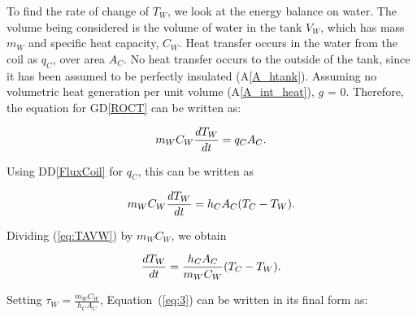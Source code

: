 \documentclass[12pt]{article}
\newcommand{\dref}[1]{GD\ref{#1}}
\newcommand{\ddref}[1]{DD\ref{#1}}
\newcommand{\aref}[1]{A\ref{#1}}
\begin{document}
To find the rate of change of $T_W$, we look at the energy balance on water.
The volume being considered is the volume of water in the tank $V_W$, which has
mass $m_W$ and specific heat capacity, $C_W$.  Heat transfer occurs in the water
from the coil as $q_C$, over area
$A_C$.  No heat transfer occurs to the outside of the
tank, since it has been assumed to be perfectly insulated (\aref{A_htank}).
 Assuming no volumetric heat generation per unit volume (\aref{A_int_heat}), $g$ = 0.  Therefore,
the equation for \dref{ROCT} can be written as:

\begin{equation*}
\\m_W C_W \frac{dT_W}{dt} = q_C A_C.
\end{equation*}

\noindent
Using \ddref{FluxCoil} 
for $q_C$, %
this can be written as

\begin{equation}
\\m_W C_W \frac{dT_W}{dt} = h_C A_C (T_C - T_W). \label{eq:TAVW}
\end{equation}

\noindent
Dividing (\ref{eq:TAVW}) by $m_W C_W$, we obtain

\begin{equation}
\\ \frac{dT_W}{dt} = \frac{h_C A_C}{m_W C_W} (T_C - T_W).\label{eq:3}
\end{equation}

\noindent





\noindent
Setting $\tau_W = \frac{m_W C_W}{h_C A_C}$, %
Equation~(\ref{eq:3}) can be written in its final form as:
\end{document}
